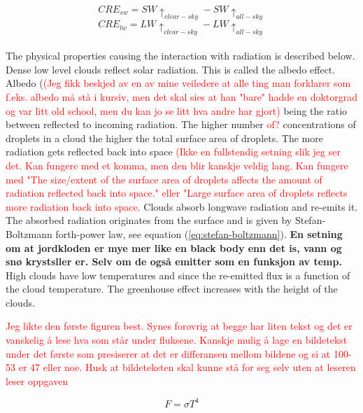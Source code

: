 \begin{equation} \label{eq:cre_sw}
    CRE_{sw} = SW\uparrow_{clear-sky} - SW\uparrow_{all-sky}
\end{equation}
\begin{equation} \label{eq:cre_lw}
    CRE_{lw} = LW\uparrow_{clear-sky} - LW\uparrow_{all-sky}
\end{equation}
\\
The physical properties causing the interaction with radiation is described below. Dense low level clouds reflect solar radiation. This is called the albedo effect. Albedo (\textcolor{red}{(Jeg fikk beskjed av en av mine veiledere at alle ting man forklarer som f.eks. albedo må stå i kursiv, men det skal sies at han "bare" hadde en doktorgrad og var litt old school, men du kan jo se litt hva andre har gjort)} being the ratio between reflected to incoming radiation. The higher number \textcolor{red}{of?} concentrations of droplets in a cloud the higher the total surface area of droplets. The more radiation gets reflected back into space \textcolor{red}{(Ikke en fullstendig setning slik jeg ser det. Kan fungere med et komma, men den blir kanskje veldig lang. Kan fungere med "The size/extent of the surface area of droplets affects the amount of radiation reflected back into space." eller "Large surface area of droplets reflects more radiation back into space}. Clouds absorb longwave radiation and re-emits it. The absorbed radiation originates from the surface and is given by Stefan-Boltzmann forth-power law, see equation (\ref{eq:stefan-boltzmann}). \textbf{En setning om at jordkloden er mye mer like en black body enn det is, vann og snø krystsller er. Selv om de også emitter som en funksjon av temp. } High clouds have low temperatures and since the re-emitted flux is a function of the cloud temperature. The greenhouse effect increases with the height of the clouds.

\textcolor{red}{Jeg likte den første figuren best. Synes forøvrig at begge har liten tekst og det er vanskelig å lese hva som står under fluksene. Kanskje mulig å lage en bildetekst under det første som presiserer at det er differansen mellom bildene og si at 100-53 er 47 eller noe. Husk at bildeteksten skal kunne stå for seg selv uten at leseren leser oppgaven}




\begin{equation} \label{eq:stefan-boltzmann}
    F = \sigma T ^4
\end{equation}

